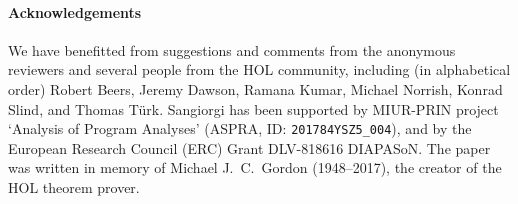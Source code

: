 
\paragraph{Acknowledgements}

We have benefitted from suggestions and comments 
from  the anonymous reviewers and several people from the HOL
community, including (in alphabetical order) Robert Beers, Jeremy Dawson,
Ramana Kumar,
Michael Norrish, 
Konrad Slind, and
Thomas T\"{u}rk.
%
Sangiorgi has been supported by 
 MIUR-PRIN project `Analysis of
Program Analyses' (ASPRA, ID: \texttt{201784YSZ5\_004}), and by the 
European Research
Council (ERC) Grant DLV-818616 DIAPASoN.
%
The paper was written in memory of Michael J.~C.~Gordon (1948--2017),
the creator of the HOL theorem prover.
